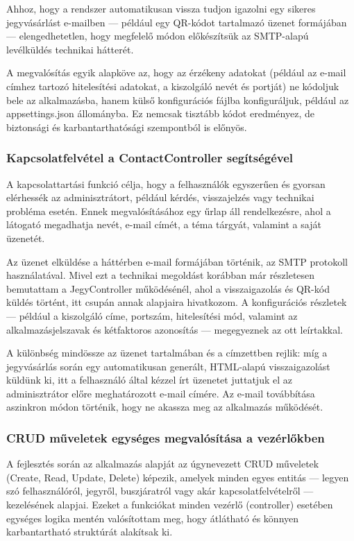 Ahhoz, hogy a rendszer automatikusan vissza tudjon igazolni egy sikeres jegyvásárlást e-mailben — például egy QR-kódot tartalmazó üzenet formájában — elengedhetetlen, hogy megfelelő módon előkészítsük az SMTP-alapú levélküldés technikai hátterét.

A megvalósítás egyik alapköve az, hogy az érzékeny adatokat (például az e-mail címhez tartozó hitelesítési adatokat, a kiszolgáló nevét és portját) ne kódoljuk bele az alkalmazásba, hanem külső konfigurációs fájlba konfiguráljuk, például az appsettings.json állományba. Ez nemcsak tisztább kódot eredményez, de biztonsági és karbantarthatósági szempontból is előnyös.


\subsubsection{Kapcsolatfelvétel a ContactController segítségével}

A kapcsolattartási funkció célja, hogy a felhasználók egyszerűen és gyorsan elérhessék az adminisztrátort, például kérdés, visszajelzés vagy technikai probléma esetén. Ennek megvalósításához egy űrlap áll rendelkezésre, ahol a látogató megadhatja nevét, e-mail címét, a téma tárgyát, valamint a saját üzenetét.

Az üzenet elküldése a háttérben e-mail formájában történik, az SMTP protokoll használatával. Mivel ezt a technikai megoldást korábban már részletesen bemutattam a JegyController működésénél, ahol a visszaigazolás és QR-kód küldés történt, itt csupán annak alapjaira hivatkozom. A konfigurációs részletek — például a kiszolgáló címe, portszám, hitelesítési mód, valamint az alkalmazásjelszavak és kétfaktoros azonosítás — megegyeznek az ott leírtakkal.

A különbség mindössze az üzenet tartalmában és a címzettben rejlik: míg a jegyvásárlás során egy automatikusan generált, HTML-alapú visszaigazolást küldünk ki, itt a felhasználó által kézzel írt üzenetet juttatjuk el az adminisztrátor előre meghatározott e-mail címére. Az e-mail továbbítása aszinkron módon történik, hogy ne akassza meg az alkalmazás működését.


\subsubsection{CRUD műveletek egységes megvalósítása a vezérlőkben}

A fejlesztés során az alkalmazás alapját az úgynevezett CRUD műveletek (Create, Read, Update, Delete) képezik, amelyek minden egyes entitás — legyen szó felhasználóról, jegyről, buszjáratról vagy akár kapcsolatfelvételről — kezelésének alapjai. Ezeket a funkciókat minden vezérlő (controller) esetében egységes logika mentén valósítottam meg, hogy átlátható és könnyen karbantartható struktúrát alakítsak ki.

